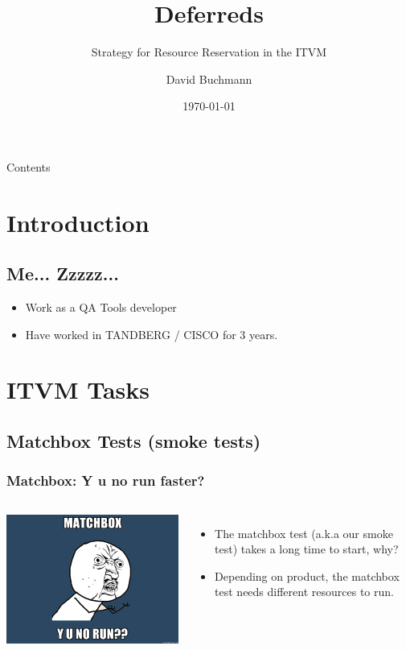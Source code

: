 \documentclass[xcolor=pdftex,dvipsnames,table]{beamer}
\title{Deferreds}
\subtitle{Strategy for Resource Reservation in the ITVM}
\author{David Buchmann}
\institute{Cisco Systems}
\date{\today}
\begin{document}
\maketitle

\begin{frame}[allowframebreaks]{Contents}
  \tableofcontents
\end{frame}

\section{Introduction}
\subsection{Me... Zzzzz...}
\begin{frame}
  \begin{itemize}
    \item Work as a QA Tools developer
    \item Have worked in TANDBERG / CISCO for 3 years.
  \end{itemize}
\end{frame}

\section{ITVM Tasks}
\subsection{Matchbox Tests (smoke tests)}
\begin{frame}
  \frametitle{Matchbox: Y u no run faster?}
  \begin{columns}[cc]
  \column{0.5 in}
  \includegraphics[scale=0.30]{matchbox.jpg}
  \column{2.4 in}
  \begin{itemize}
    \item The matchbox test (a.k.a our smoke test) takes a long time to start, why?
    \item Depending on product, the matchbox test
      needs different resources to run.
  \end{itemize}
  \end{columns}
\end{frame}
\end{document}
